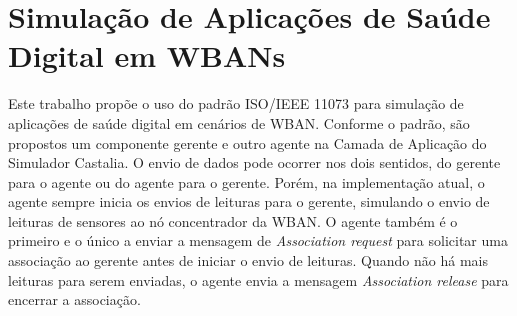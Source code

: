 \section{Simulação de Aplicações de Saúde Digital em WBANs}\label{castaliaapplayer}

Este trabalho propõe o uso do padrão ISO/IEEE 11073 para simulação de aplicações de saúde digital em cenários de WBAN. Conforme o padrão, são propostos um componente gerente e outro agente na Camada de Aplicação do Simulador Castalia. 
O envio de dados pode ocorrer nos dois sentidos, do gerente para o agente ou do agente para o gerente. Porém, na implementação atual, o agente sempre inicia os envios de leituras para o gerente, simulando o envio de leituras de sensores ao nó concentrador da WBAN. O agente também é o primeiro e o único a enviar a mensagem de \textit{Association request} para solicitar uma associação ao gerente antes de iniciar o envio de leituras. Quando não há mais leituras para serem enviadas, o agente envia a mensagem \textit{Association release} para encerrar a associação. 


